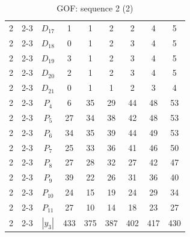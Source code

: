 \documentclass[aspectratio=169,ignorenonframetext,9pt]{beamer}
\theoremstyle{plain}
\theoremstyle{definition}
\begin{document}
\begin{table}[h!]
\begin{tabular}{c| c | c | c | c |c |c |c |c }
            2 & 2-3 & $D_{17}$ & 1 &  1& 2& 2& 4& 5 \\
            2 & 2-3 & $D_{18}$ & 0 &  1& 2& 3& 4& 5 \\
            2 & 2-3 & $D_{19}$ & 3 &  1& 2& 3& 4& 5 \\
            2 & 2-3 & $D_{20}$ & 2 &  1& 2& 3& 4& 5 \\
            2 & 2-3 & $D_{21}$ & 0 &  1& 1& 2& 3& 4 \\
            2 & 2-3 & $P_4$ & 6 & 35& 29& 44& 48& 53 \\
            2 & 2-3 & $P_5$ & 27 & 34& 38& 42& 48& 53 \\
            2 & 2-3 & $P_6$ & 34 & 35& 39& 44& 49& 53 \\
            2 & 2-3 & $P_7$ & 25 & 33& 36& 41& 46& 50 \\
            2 & 2-3 & $P_8$ & 27 & 28& 32& 27& 42& 47 \\
            2 & 2-3 & $P_9$ & 39 & 22& 26& 31& 36& 40 \\
            2 & 2-3 & $P_{10}$ & 24 & 15& 19& 24& 29& 34 \\
            2 & 2-3 & $P_{11}$ & 27 & 10& 14& 18& 23& 27 \\
            2 & 2-3 & $|y_3|$ & 433 &  375& 387& 402& 417& 430 \\
        \end{tabular}
        \caption{GOF: sequence 2 (2)}
    \end{table}
\clearpage
\end{document}
